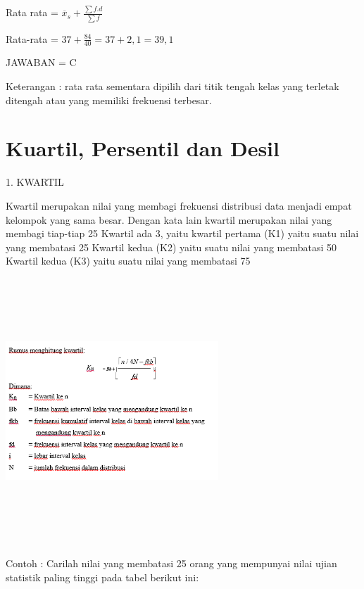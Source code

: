 \documentclass[11pt,fleqn]{book} %
\begin{document}
{Rata rata = $\overline{x}_{s} + \frac{\sum f.d}{\sum f} $

Rata-rata = $ 37 + \frac{84}{40} = 37 + 2,1 = 39,1$

JAWABAN = C

Keterangan :
rata rata sementara dipilih dari titik tengah kelas yang terletak ditengah atau yang memiliki frekuensi terbesar.

\section{Kuartil, Persentil dan Desil}
1. KWARTIL

Kwartil merupakan nilai yang membagi frekuensi distribusi data menjadi empat kelompok yang sama besar. Dengan kata lain kwartil merupakan nilai yang membagi tiap-tiap 25%
Kwartil ada 3, yaitu kwartil pertama (K1) yaitu suatu nilai yang membatasi 25%
Kwartil kedua (K2) yaitu suatu nilai yang membatasi 50%
Kwartil kedua (K3) yaitu suatu nilai yang membatasi 75%
 
\includegraphics[width = 8cm, height= 10cm]{Pictures/rizkie1.png}

Contoh :
Carilah nilai yang membatasi 25 orang yang mempunyai nilai ujian statistik paling tinggi pada tabel berikut ini:

}
\end{document}
